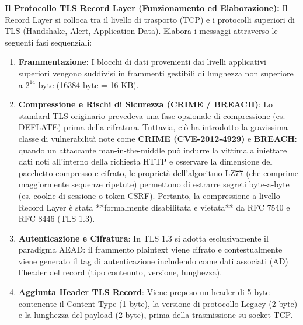 \documentclass[11pt,a4paper]{article}
\begin{document}
\begin{solutionbox}
\textbf{Il Protocollo TLS Record Layer (Funzionamento ed Elaborazione):}
Il Record Layer si colloca tra il livello di trasporto (TCP) e i protocolli superiori di TLS (Handshake, Alert, Application Data). Elabora i messaggi attraverso le seguenti fasi sequenziali:
\begin{enumerate}
    \item \textbf{Frammentazione}: I blocchi di dati provenienti dai livelli applicativi superiori vengono suddivisi in frammenti gestibili di lunghezza non superiore a $2^{14}$ byte (16384 byte = 16 KB).
    \item \textbf{Compressione e Rischi di Sicurezza (CRIME / BREACH)}:
    Lo standard TLS originario prevedeva una fase opzionale di compressione (es. DEFLATE) prima della cifratura. Tuttavia, ci\`o ha introdotto la gravissima classe di vulnerabilit\`a note come \textbf{CRIME (CVE-2012-4929)} e \textbf{BREACH}: quando un attaccante man-in-the-middle pu\`o indurre la vittima a iniettare dati noti all'interno della richiesta HTTP e osservare la dimensione del pacchetto compresso e cifrato, le propriet\`a dell'algoritmo LZ77 (che comprime maggiormente sequenze ripetute) permettono di estrarre segreti byte-a-byte (es. cookie di sessione o token CSRF). Pertanto, la compressione a livello Record Layer \`e stata **formalmente disabilitata e vietata** da RFC 7540 e RFC 8446 (TLS 1.3).
    \item \textbf{Autenticazione e Cifratura}: In TLS 1.3 si adotta esclusivamente il paradigma AEAD: il frammento plaintext viene cifrato e contestualmente viene generato il tag di autenticazione includendo come dati associati (AD) l'header del record (tipo contenuto, versione, lunghezza).
    \item \textbf{Aggiunta Header TLS Record}: Viene prepeso un header di 5 byte contenente il Content Type (1 byte), la versione di protocollo Legacy (2 byte) e la lunghezza del payload (2 byte), prima della trasmissione su socket TCP.
\end{enumerate}
\end{solutionbox}
\end{document}
